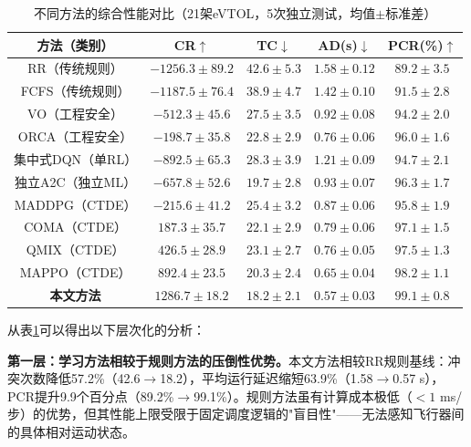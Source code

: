 \documentclass[12pt,a4paper,UTF8]{ctexart}
\begin{document}
\begin{table}[H]
    \centering
    \caption{不同方法的综合性能对比（21架eVTOL，5次独立测试，均值$\pm$标准差）}
    \label{tab:comparison}
    \begin{tabular}{|c|c|c|c|c|}
        \hline
        \textbf{方法（类别）} & \textbf{CR$\uparrow$} & \textbf{TC$\downarrow$} & \textbf{AD(s)$\downarrow$} & \textbf{PCR(\%)$\uparrow$} \\
        \hline
        RR（传统规则） & $-1256.3 \pm 89.2$ & $42.6 \pm 5.3$ & $1.58 \pm 0.12$ & $89.2 \pm 3.5$ \\
        FCFS（传统规则） & $-1187.5 \pm 76.4$ & $38.9 \pm 4.7$ & $1.42 \pm 0.10$ & $91.5 \pm 2.8$ \\
        VO（工程安全） & $-512.3 \pm 45.6$ & $27.5 \pm 3.5$ & $0.92 \pm 0.08$ & $94.2 \pm 2.0$ \\
        ORCA（工程安全） & $-198.7 \pm 35.8$ & $22.8 \pm 2.9$ & $0.76 \pm 0.06$ & $96.0 \pm 1.6$ \\
        集中式DQN（单RL） & $-892.5 \pm 65.3$ & $28.3 \pm 3.9$ & $1.21 \pm 0.09$ & $94.7 \pm 2.1$ \\
        独立A2C（独立ML） & $-657.8 \pm 52.6$ & $19.7 \pm 2.8$ & $0.93 \pm 0.07$ & $96.3 \pm 1.7$ \\
        MADDPG（CTDE） & $-215.6 \pm 41.2$ & $25.4 \pm 3.2$ & $0.87 \pm 0.06$ & $95.8 \pm 1.9$ \\
        COMA（CTDE） & $187.3 \pm 35.7$ & $22.1 \pm 2.9$ & $0.79 \pm 0.06$ & $97.1 \pm 1.5$ \\
        QMIX（CTDE） & $426.5 \pm 28.9$ & $23.1 \pm 2.7$ & $0.76 \pm 0.05$ & $97.5 \pm 1.3$ \\
        MAPPO（CTDE） & $892.4 \pm 23.5$ & $20.3 \pm 2.4$ & $0.65 \pm 0.04$ & $98.2 \pm 1.1$ \\
        \textbf{本文方法} & $\mathbf{1286.7 \pm 18.2}$ & $\mathbf{18.2 \pm 2.1}$ & $\mathbf{0.57 \pm 0.03}$ & $\mathbf{99.1 \pm 0.8}$ \\
        \hline
    \end{tabular}
\end{table}

从表\ref{tab:comparison}可以得出以下层次化的分析：

\textbf{第一层：学习方法相较于规则方法的压倒性优势。}本文方法相较RR规则基线：冲突次数降低57.2\%（42.6$\to$18.2），平均运行延迟缩短63.9\%（1.58$\to$0.57 s），PCR提升9.9个百分点（89.2\%$\to$99.1\%）。规则方法虽有计算成本极低（$<1$ ms/步）的优势，但其性能上限受限于固定调度逻辑的"盲目性"——无法感知飞行器间的具体相对运动状态。
\end{document}

